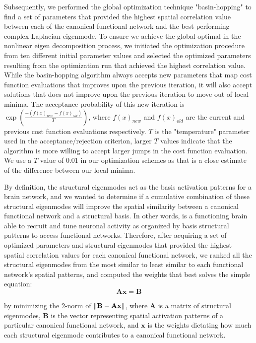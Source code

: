 \documentclass{article}
\begin{document}
Subsequently, we performed the global optimization technique "basin-hopping" \cite{Wales1997} to find a set of parameters that provided the highest spatial correlation value between each of the canonical functional network and the best performing complex Laplacian eigenmode. To ensure we achieve the global optimal in the nonlinear eigen decomposition process, we initiated the optimization procedure from ten different initial parameter values and selected the optimized parameters resulting from the optimization run that achieved the highest correlation value. While the basin-hopping algorithm always accepts new parameters that map cost function evaluations that improves upon the previous iteration, it will also accept solutions that does not improve upon the previous iteration to move out of local minima. The acceptance probability of this new iteration is $\exp(\frac{-(f(x)_{new} - f(x)_{old})}{T})$, where $f(x)_{new}$ and $f(x)_{old}$ are the current and previous cost function evaluations respectively. $T$ is the "temperature" parameter used in the acceptance/rejection criterion, larger $T$ values indicate that the algorithm is more willing to accept larger jumps in the cost function evaluation. We use a $T$ value of $0.01$ in our optimization schemes as that is a close estimate of the difference between our local minima.

By definition, the structural eigenmodes act as the basis activation patterns for a brain network, and we wanted to determine if a cumulative combination of these structural eigenmodes will improve the spatial similarity between a canonical functional network and a structural basis. In other words, is a functioning brain able to recruit and tune neuronal activity as organized by basis structural patterns to access functional networks. Therefore, after acquiring a set of optimized parameters and structural eigenmodes that provided the highest spatial correlation values for each canonical functional network, we ranked all the structural eigenmodes from the most similar to least similar to each functional network's spatial patterns, and computed the weights that best solves the simple equation:
\begin{equation}
    \mathbf{Ax = B}
\end{equation}

by minimizing the 2-norm of $\mathbf{\norm{B-Ax}}$, where $\mathbf{A}$ is a matrix of structural eigenmodes, $\mathbf{B}$ is the vector representing spatial activation patterns of a particular canonical functional network, and $\mathbf{x}$ is the weights dictating how much each structural eigenmode contributes to a canonical functional network. 
\end{document}
